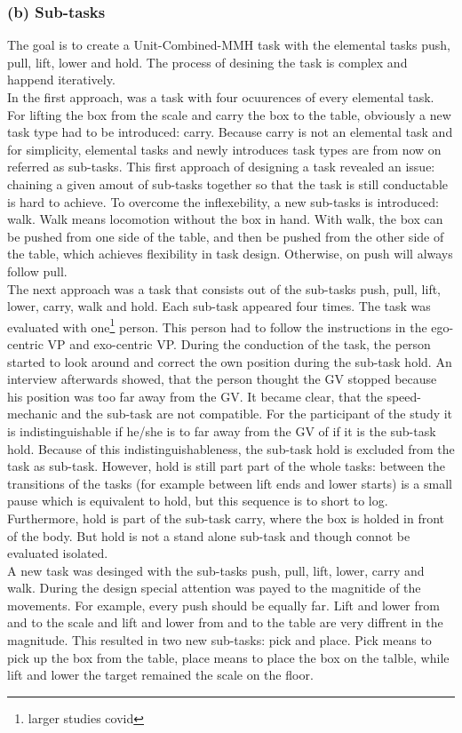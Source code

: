 \subsubsection{(b) Sub-tasks}
The goal is to create a Unit-Combined-MMH task with the elemental tasks push, pull, lift, lower and hold. The process of desining the task is complex and happend iteratively.\\
In the first approach, was a task with four ocuurences of every elemental task. For lifting the box from the scale and carry the box to the table, obviously a new task type had to be introduced: carry. Because carry is not an elemental task and for simplicity, elemental tasks and newly introduces task types are from now on referred as sub-tasks. This first approach of designing a task revealed an issue: chaining a given amout of sub-tasks together so that the task is still conductable is hard to achieve. To overcome the inflexebility, a new sub-tasks is introduced: walk. Walk means locomotion without the box in hand. With walk, the box can be pushed from one side of the table, and then be pushed from the other side of the table, which achieves flexibility in task design. Otherwise, on push will always follow pull.\\
The next approach was a task that consists out of the sub-tasks push, pull, lift, lower, carry, walk and hold. Each sub-task appeared four times. The task was evaluated with one\footnote{larger studies covid} person. This person had to follow the instructions in the ego-centric VP and exo-centric VP. During the conduction of the task, the person started to look around and correct the own position during the sub-task hold. An interview afterwards showed, that the person thought the GV stopped because his position was too far away from the GV. It became clear, that the speed-mechanic and the sub-task are not compatible. For the participant of the study it is indistinguishable if he/she is to far away from the GV of if it is the sub-task hold. Because of this indistinguishableness, the sub-task hold is excluded from the task as sub-task. However, hold is still part part of the whole tasks: between the transitions of the tasks (for example between lift ends and lower starts) is a small pause which is equivalent to hold, but this sequence is to short to log. Furthermore, hold is part of the sub-task carry, where the box is holded in front of the body. But hold is not a stand alone sub-task and though connot be evaluated isolated.\\
A new task was desinged with the sub-tasks push, pull, lift, lower, carry and walk. During the design special attention was payed to the magnitide of the movements. For example, every push should be equally far. Lift and lower from and to the scale and lift and lower from and to the table are very diffrent in the magnitude. This resulted in two new sub-tasks: pick and place. Pick means to pick up the box from the table, place means to place the box on the talble, while lift and lower the target remained the scale on the floor.\\
